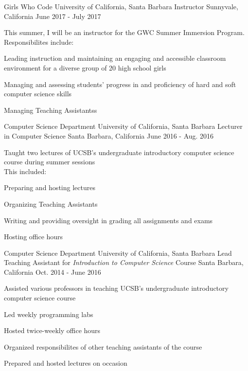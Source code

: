 \begin{cventries}

  \cventry
{Girls Who Code \newline University of California, Santa Barbara}
    {Instructor}
    {Sunnyvale, California}
    {June 2017 - July 2017}
    {
      \begin{cvitems}
	\item {This summer, I will be an instructor for the GWC Summer Immersion Program. Responsibilites include:}\\
	\begin{cvitems}
        \item Leading instruction and maintaining an engaging and accessible classroom environment for a diverse group of 20 high school girls
	\item Managing and assessing students’ progress in and proficiency of hard and soft computer science skills
	\item Managing Teaching Assistantss 
	\end{cvitems}
      \end{cvitems}
    }

  \cventry
{Computer Science Department \newline University of California, Santa Barbara}
    {Lecturer in Computer Science}
    {Santa Barbara, California}
    {June 2016 - Aug. 2016}
    {
      \begin{cvitems}
	\item {Taught two lectures of UCSB's undergraduate introductory computer science course during summer sessions\\This included:}\\
	\begin{cvitems}
        \item Preparing and hosting lectures
	\item Organizing Teaching Assistants
	\item Writing and providing oversight in grading all assignments and exams
	\item Hosting office hours 
	\end{cvitems}
      \end{cvitems}
    }

  \cventry
{Computer Science Department \newline University of California, Santa Barbara}
    {Lead Teaching Assistant for \emph{Introduction to Computer Science} Course}
    {Santa Barbara, California}
    {Oct. 2014 - June 2016}
    {
      \begin{cvitems}
	\item {Assisted various professors in teaching UCSB's undergraduate introductory computer science course}
        \item {Led weekly programming labs}
        \item {Hosted twice-weekly office hours}
        \item {Organized responsibilites of other teaching assistants of the course}
	\item {Prepared and hosted lectures on occasion}
      \end{cvitems}
    }


\end{cventries}
